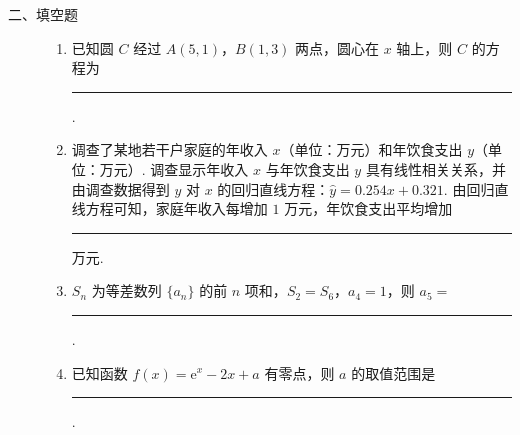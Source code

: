 \begin{description}

    \item[二、填空题]

    \begin{enumerate}[leftmargin=5pt]

      \addtocounter{enumi}{+12}

        \item 已知圆 \(C\) 经过 \(A(5,1)\)，\(B(1,3)\) 两点，圆心在 \(x\) 轴上，则 \(C\) 的方程为\rule[-0.3ex]{3em}{0.4pt}.

        \item 调查了某地若干户家庭的年收入 \(x\)（单位：万元）和年饮食支出 \(y\)（单位：万元）. 调查显示年收入 \(x\) 与年饮食支出 \(y\) 具有线性相关关系，并由调查数据得到 \(y\) 对 \(x\) 的回归直线方程：\(\hat{y} = 0.254x + 0.321\). 由回归直线方程可知，家庭年收入每增加 \(1\) 万元，年饮食支出平均增加\rule[-0.3ex]{3em}{0.4pt} 万元.

        \item \(S_{n}\) 为等差数列 \(\{a_{n}\}\) 的前 \(n\) 项和，\(S_{2} = S_{6}\)，\(a_{4} = 1\)，则 \(a_{5} =\)\rule[-0.3ex]{3em}{0.4pt}.

        \item 已知函数 \(f(x) = {\mathrm{e}}^{x} - 2x + a\) 有零点，则 \(a\) 的取值范围是\rule[-0.3ex]{3em}{0.4pt}.

    \end{enumerate}

\end{description}

